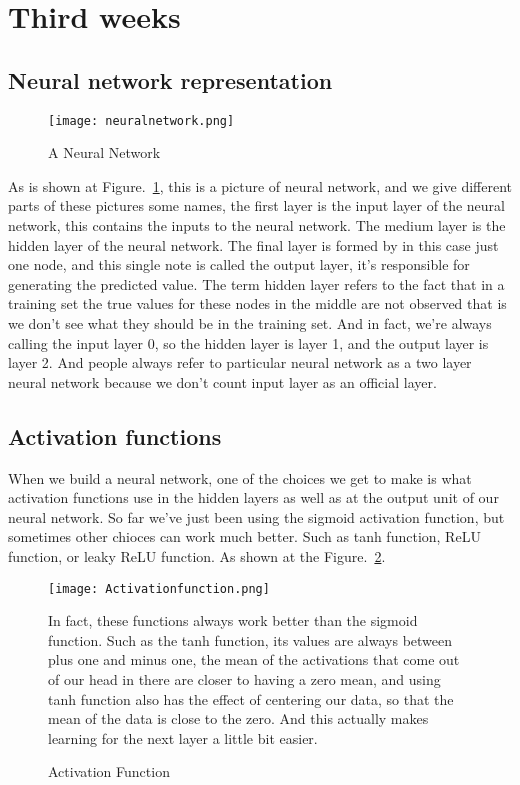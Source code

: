 \documentclass[a4paper]{article}
\begin{document}
\section{Third weeks}
\subsection{Neural network representation}
\begin{figure}[htbp]
 \begin{center}
 \texttt{[image: neuralnetwork.png]}
  \end{center}
 \caption{A Neural Network}
 \label{network}
\end{figure}
\par As is shown at Figure.~\ref{network}, this is a picture of neural network, and we give different parts of these pictures some names, the first layer is the input layer of the neural network, this contains the inputs to the neural network. The medium layer is the hidden layer of the neural network. The final layer is formed by in this case just one node, and this single note is called the output layer, it's responsible for generating the predicted value. The term hidden layer refers to the fact that in a training set the true values for these nodes in the middle are not observed that is we don't see what they should be in the training set. And in fact, we're always calling the input layer 0, so the hidden layer is layer 1, and the output layer is layer 2. And people always refer to particular neural network as a two layer neural network because we don't count input layer as an official layer.
\subsection{Activation functions}
\par When we build a neural network, one of the choices we get to make is what activation functions use in the hidden layers as well as at the output unit of our neural network. So far we've just been using the sigmoid activation function, but sometimes other chioces can work much better. Such as tanh function, ReLU function, or leaky ReLU function. As shown at the Figure.~\ref{actf}.
\begin{figure}[htbp]
 \begin{center}
 \texttt{[image: Activationfunction.png]}
  \end{center}
 \caption{Activation Function}
 \label{actf}
In fact, these functions always work better than the sigmoid function. Such as the tanh function, its values are always between plus one and minus one, the mean of the activations that come out of our head in there are closer to having a zero mean, and using tanh function also has the effect of centering our data, so that the mean of the data is close to the zero. And this actually makes learning for the next layer a little bit easier.
\end{figure}
\end{document}
